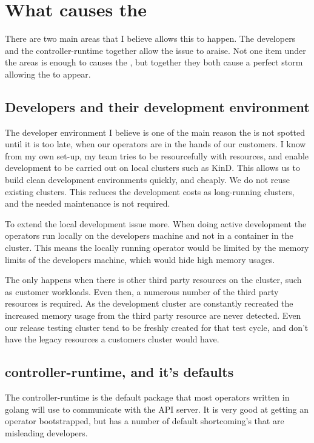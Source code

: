 
\section{What causes the \nn{}}
\label{sec:why}

There are two main areas that I believe allows this to happen.
The developers and the controller-runtime together allow the issue to araise.
Not one item under the areas is enough to causes the \nn{}, but together they both cause a perfect storm allowing the \nn{} to appear.

\subsection{Developers and their development environment}
The developer environment I believe is one of the main reason the \nn{} is not spotted until it is too late, when our operators are in the hands of our customers.
I know from my own set-up, my team tries to be resourcefully with resources, and enable development to be carried out on local clusters such as KinD\cite{noauthor_kind_nodate}.
This allows us to build clean development environments quickly, and cheaply.
We do not reuse existing clusters.
This reduces the development costs as long-running clusters, and the needed maintenance is not required.

To extend the local development issue more.
When doing active development the operators run locally on the developers machine and not in a container\cite{noauthor_containers_nodate} in the cluster.
This means the locally running operator would be limited by the memory limits of the developers machine, which would hide high memory usages.

The \nn{} only happens when there is other third party resources on the cluster, such as customer workloads.
Even then, a numerous number of the third party resources is required.
As the development cluster are constantly recreated the increased memory usage from the third party resource are never detected.
Even our release testing cluster tend to be freshly created for that test cycle, and don't have the legacy resources a customers cluster would have.

\subsection{controller-runtime, and it's defaults}
The controller-runtime is the default package that most operators written in golang\cite{noauthor_go_nodate} will use to communicate with the API server.
It is very good at getting an operator bootstrapped, but has a number of default shortcoming's that are misleading developers.

